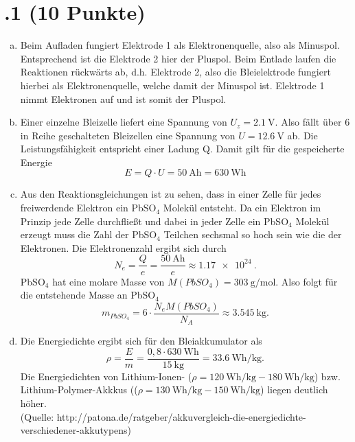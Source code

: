 \section*{\nr.1 \titone (10 Punkte)}
\begin{enumerate}[(a)]
\item
Beim Aufladen fungiert Elektrode 1 als Elektronenquelle, also als Minuspol. Entsprechend ist die Elektrode 2 hier der Pluspol. Beim Entlade laufen die Reaktionen rückwärts ab, d.h. Elektrode 2, also die Bleielektrode fungiert hierbei als Elektronenquelle, welche damit der Minuspol ist. Elektrode 1 nimmt Elektronen auf und ist somit der Pluspol.
\item
Einer einzelne Bleizelle liefert eine Spannung von $U_{z} = \SI {2.1}{\volt}$. Also fällt über 6 in Reihe geschalteten Bleizellen eine Spannung von $U = \SI {12.6}{\volt}$ ab. Die Leistungsfähigkeit entspricht einer Ladung Q. Damit gilt für die gespeicherte Energie
\begin{equation}
	E = Q \cdot U = \SI{50}{\ampere\hour} =\SI {630}{\watt\hour} 
\end{equation}
\item
Aus den Reaktionsgleichungen ist zu sehen, dass in einer Zelle für jedes freiwerdende Elektron ein PbSO$_{4}$ Molekül entsteht. Da ein Elektron im Prinzip jede Zelle durchfließt und dabei in jeder Zelle ein PbSO$_{4}$ Molekül erzeugt muss die Zahl der PbSO$_{4}$ Teilchen sechsmal so hoch sein wie die der Elektronen.
Die Elektronenzahl ergibt sich durch
\begin{equation}
	N_{e} = \frac{Q}{e} = \frac{\SI {50}{\ampere\hour}}{e} \approx \SI {1.17e24}{}.
\end{equation} 
PbSO$_{4}$ hat eine molare Masse von $M(PbSO_{4}) = \SI[per-mode=fraction]{303}{\gram\per\mol}$. Also folgt für die entstehende Masse an PbSO$_{4}$
\begin{equation}
	m_{PbSO_{4}} = 6 \cdot \frac{N_{e} M(PbSO_{4})}{N_{A}} \approx \SI {3.545}{\kilogram}.
\end{equation}
\item
Die Energiedichte ergibt sich für den Bleiakkumulator als
\begin{equation}
	\rho = \frac{E}{m} = \frac{0,8 \cdot \SI {630}{\watt \hour}}{\SI {15}{\kilogram}} = \SI[per-mode=fraction] {33,6}{\watt\hour\per\kilogram}.
\end{equation}
Die Energiedichten von Lithium-Ionen- ($\rho = \SI {120}{\watt\hour\per\kilogram} - \SI {180}{\watt\hour\per\kilogram}$) bzw. Lithium-Polymer-Akkkus (($\rho = \SI {130}{\watt\hour\per\kilogram} - \SI {150}{\watt\hour\per\kilogram}$) liegen deutlich höher. \\(Quelle: http://patona.de/ratgeber/akkuvergleich-die-energiedichte-verschiedener-akkutypens)
\end{enumerate}
